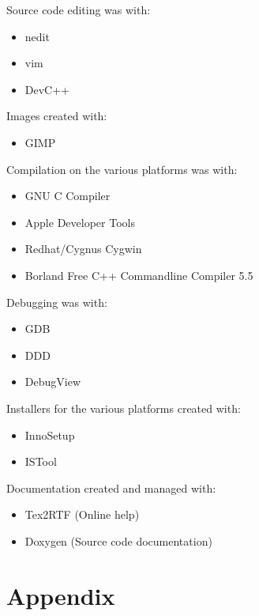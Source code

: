 \begin{helponly}
Source code editing was with:
\begin{itemize}
  \item nedit  
  \item vim   
  \item DevC++ 
\end{itemize}

Images created with:
\begin{itemize}
  \item GIMP 
\end{itemize}

Compilation on the various platforms was with:
\begin{itemize}
  \item GNU C Compiler 
  \item Apple Developer Tools 
  \item Redhat/Cygnus Cygwin 
  \item Borland Free C++ Commandline Compiler 5.5 
\end{itemize}

Debugging was with:
\begin{itemize}
  \item GDB 
  \item DDD 
  \item DebugView 
\end{itemize}

Installers for the various platforms created with:
\begin{itemize}
  \item InnoSetup 
  \item ISTool 
\end{itemize}

Documentation created and managed with:
\begin{itemize}
  \item Tex2RTF (Online help) 
  \item Doxygen (Source code documentation) 
\end{itemize}

\chapter{Appendix}\label{pd-appendix}


\end{helponly}

